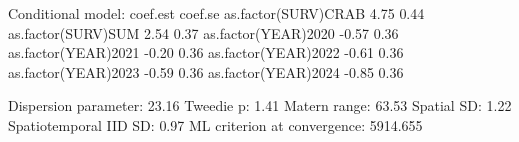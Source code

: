 \documentclass[
  letterpaper,
  DIV=11,
  numbers=noendperiod]{scrreprt}
\newenvironment{Shaded}{\begin{snugshade}}{\end{snugshade}}
\newcommand{\DecValTok}[1]{\textcolor[rgb]{0.68,0.00,0.00}{#1}}
\newcommand{\FloatTok}[1]{\textcolor[rgb]{0.68,0.00,0.00}{#1}}
\newcommand{\FunctionTok}[1]{\textcolor[rgb]{0.28,0.35,0.67}{#1}}
\newcommand{\NormalTok}[1]{\textcolor[rgb]{0.00,0.23,0.31}{#1}}
\newcommand{\SpecialCharTok}[1]{\textcolor[rgb]{0.37,0.37,0.37}{#1}}
\begin{document}
\begin{Shaded}
\begin{Highlighting}[]
\NormalTok{Conditional model}\SpecialCharTok{:}
\NormalTok{                    coef.est coef.se}
\FunctionTok{as.factor}\NormalTok{(SURV)CRAB     }\FloatTok{4.75}    \FloatTok{0.44}
\FunctionTok{as.factor}\NormalTok{(SURV)SUM      }\FloatTok{2.54}    \FloatTok{0.37}
\FunctionTok{as.factor}\NormalTok{(YEAR)}\DecValTok{2020}    \SpecialCharTok{{-}}\FloatTok{0.57}    \FloatTok{0.36}
\FunctionTok{as.factor}\NormalTok{(YEAR)}\DecValTok{2021}    \SpecialCharTok{{-}}\FloatTok{0.20}    \FloatTok{0.36}
\FunctionTok{as.factor}\NormalTok{(YEAR)}\DecValTok{2022}    \SpecialCharTok{{-}}\FloatTok{0.61}    \FloatTok{0.36}
\FunctionTok{as.factor}\NormalTok{(YEAR)}\DecValTok{2023}    \SpecialCharTok{{-}}\FloatTok{0.59}    \FloatTok{0.36}
\FunctionTok{as.factor}\NormalTok{(YEAR)}\DecValTok{2024}    \SpecialCharTok{{-}}\FloatTok{0.85}    \FloatTok{0.36}

\NormalTok{Dispersion parameter}\SpecialCharTok{:} \FloatTok{23.16}
\NormalTok{Tweedie p}\SpecialCharTok{:} \FloatTok{1.41}
\NormalTok{Matern range}\SpecialCharTok{:} \FloatTok{63.53}
\NormalTok{Spatial SD}\SpecialCharTok{:} \FloatTok{1.22}
\NormalTok{Spatiotemporal IID SD}\SpecialCharTok{:} \FloatTok{0.97}
\NormalTok{ML criterion at convergence}\SpecialCharTok{:} \FloatTok{5914.655}


\end{Highlighting}
\end{Shaded}
\end{document}
